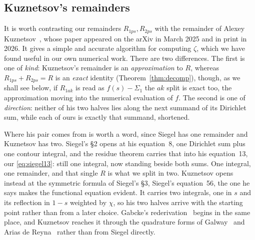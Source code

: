 \documentclass[11pt]{article}
\theoremstyle{definition}
\begin{document}
\subsection{Kuznetsov's remainders}\label{sec:kuznetsov}

It is worth contrasting our remainders $R_{1ps},R_{2ps}$ with the
remainder of Alexey
Kuznetsov~\cite{Kuznetsov2025}, whose paper appeared on the arXiv in March 2025
and in print in 2026. It gives a simple and accurate algorithm for
computing $\zeta$, which we have found useful in our own numerical work.
There are two differences. The first is one of \emph{kind}: Kuznetsov's
remainder is an \emph{approximation} to $R$, whereas $R_{1ps}+R_{2ps}=R$ is an
\emph{exact} identity (Theorem~\ref{thm:decomp}), though, as we shall see
below, if $R_{1ak}$ is read as $f(s)-\Sigma_1$ the $ak$ split is exact too,
the approximation moving into the numerical evaluation of $f$. The second is one of
\emph{direction}: neither of his two halves lies along the next summand of its
Dirichlet sum, while each of ours is exactly that summand, shortened.

Where his pair comes from is worth a word, since Siegel has one remainder and
Kuznetsov has two. Siegel's \S2 opens at his equation~8, one Dirichlet sum plus
one contour integral, and the residue theorem carries that into his
equation~13, our \eqref{eq:siegel13}: still one integral, now standing beside
both sums. One integral, one remainder, and that single $R$ is what we split in
two. Kuznetsov opens instead at the symmetric formula of Siegel's \S3, Siegel's
equation~56, the one he says makes the functional equation evident. It
carries two integrals, one in $s$ and its reflection in $1-s$ weighted by
$\chi$, so his two halves arrive with the starting point rather than from a
later choice. Gabcke's rederivation~\cite{Gabcke1979} begins in the same place,
and Kuznetsov reaches it through the quadrature forms of
Galway~\cite{Galway2001} and Arias de Reyna~\cite{AriasDeReyna2011} rather than
from Siegel directly.
\end{document}

